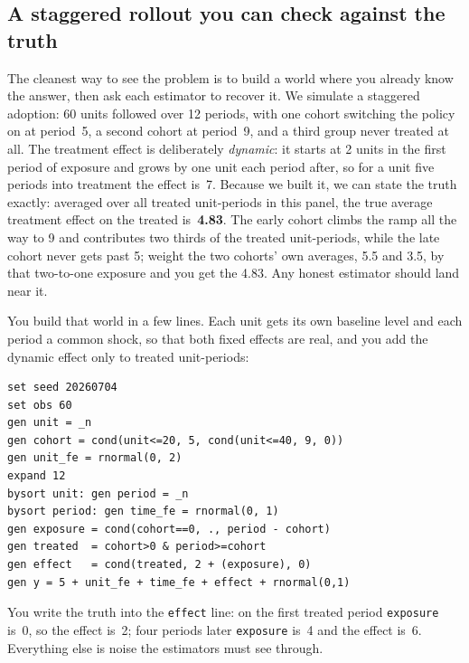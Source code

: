 \subsection{A staggered rollout you can check against the truth}
The cleanest way to see the problem is to build a world where you already know the answer, then ask each estimator to recover it. We simulate a staggered adoption: 60 units followed over 12 periods, with one cohort switching the policy on at period~5, a second cohort at period~9, and a third group never treated at all. The treatment effect is deliberately \emph{dynamic}: it starts at 2 units in the first period of exposure and grows by one unit each period after, so for a unit five periods into treatment the effect is~7. Because we built it, we can state the truth exactly: averaged over all treated unit-periods in this panel, the true average treatment effect on the treated is~\textbf{4.83}. The early cohort climbs the ramp all the way to 9 and contributes two thirds of the treated unit-periods, while the late cohort never gets past 5; weight the two cohorts' own averages, 5.5 and 3.5, by that two-to-one exposure and you get the 4.83. Any honest estimator should land near it.

You build that world in a few lines. Each unit gets its own baseline level and each period a common shock, so that both fixed effects are real, and you add the dynamic effect only to treated unit-periods:
\par
{\footnotesize
\begin{verbatim}
set seed 20260704
set obs 60
gen unit = _n
gen cohort = cond(unit<=20, 5, cond(unit<=40, 9, 0))
gen unit_fe = rnormal(0, 2)
expand 12
bysort unit: gen period = _n
bysort period: gen time_fe = rnormal(0, 1)
gen exposure = cond(cohort==0, ., period - cohort)
gen treated  = cohort>0 & period>=cohort
gen effect   = cond(treated, 2 + (exposure), 0)
gen y = 5 + unit_fe + time_fe + effect + rnormal(0,1)
\end{verbatim}
}
You write the truth into the \texttt{effect} line: on the first treated period \texttt{exposure} is~0, so the effect is~2; four periods later \texttt{exposure} is~4 and the effect is~6. Everything else is noise the estimators must see through.

